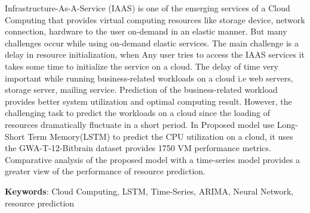 Infrastructure-As-A-Service (IAAS) is one of the emerging services of a Cloud Computing that provides virtual computing resources like storage device, network connection, hardware to the user on-demand in an elastic manner. But many challenges occur while using on-demand elastic services. The main challenge is a delay in resource initialization, when Any user tries to access the IAAS services it takes some time to initialize the service on a cloud. The delay of time very important while running business-related workloads on a cloud i.e web servers, storage server, mailing service. Prediction of the business-related workload provides better system utilization and optimal computing result. However, the challenging task to predict the workloads on a cloud since the loading of resources dramatically fluctuate in a short period. In Proposed model use Long-Short Term Memory(LSTM) to predict the CPU utilization on a cloud, it uses the GWA-T-12-Bitbrain \cite{shen2015statistical} dataset provides 1750 VM performance metrics. Comparative analysis of the proposed model with a time-series model provides a greater view of the performance of resource prediction.
  

\textbf{Keywords}:
Cloud Computing, LSTM, Time-Series, ARIMA, Neural Network, resource prediction


